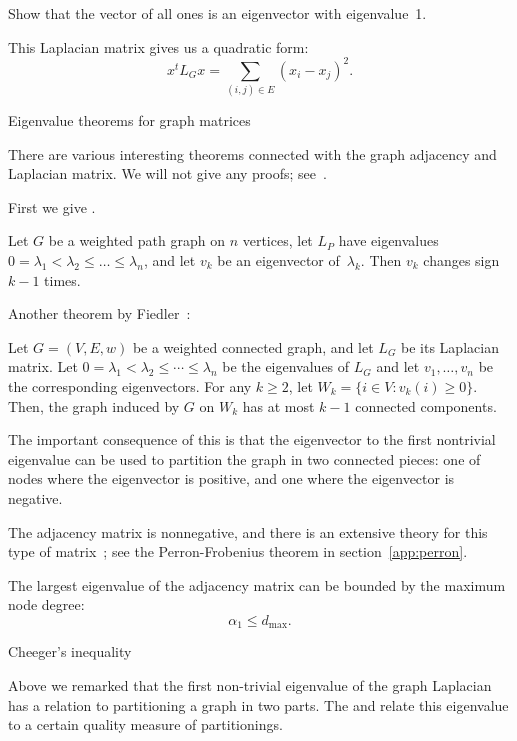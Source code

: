 \begin{exercise}
  Show that the vector of all ones is an eigenvector with eigenvalue~1.
\end{exercise}

This Laplacian matrix gives us a quadratic form:
\[ x^tL_Gx = \sum_{(i,j)\in E} (x_i-x_j)^2. \]

 {Eigenvalue theorems for graph matrices}
\label{sec:fiedler-vector}

There are various interesting theorems connected with the graph
adjacency and Laplacian matrix. We will not give any proofs;
see~\cite{Spielman:spectral-graph-theory}.

First we give .
\begin{theorem}
  Let $G$ be a weighted path graph on $n$ vertices, let $L_P$ have
  eigenvalues $0 = \lambda_1 < \lambda_2\leq\ldots\leq\lambda_n$, and let
  $v_k$ be an eigenvector of~$\lambda_k$. Then $v_k$ changes sign
  $k-1$ times.
\end{theorem}

Another theorem by Fiedler~\cite{Fiedler:75-property}:
\begin{theorem}
  Let $G = (V,E,w)$ be a weighted connected graph, and let $L_G$ be
  its Laplacian matrix. Let $0 = \lambda_1 < \lambda_2 \leq \cdots
  \leq \lambda_n$ be the eigenvalues of $L_G$ and let $v_1,\ldots,v_n$
  be the corresponding eigenvectors. For any $k \geq 2$, let $W_k
  =\{i\in V\colon v_k(i)\geq0\}$. Then, the graph induced by $G$ on $W_k$
  has at most $k-1$ connected components.
\end{theorem}

The important consequence of this is that the eigenvector to the first
nontrivial eigenvalue can be used to partition the graph in two connected
pieces: one of nodes where the eigenvector is positive, and one where
the eigenvector is negative.

The adjacency matrix is nonnegative, and there is an extensive theory
for this type of matrix~\cite{BePl:book}; see the Perron-Frobenius
theorem in section~\ref{app:perron}.

\begin{lemma}
  The largest eigenvalue of the adjacency matrix can be bounded by the
  maximum node degree:
  \[ \alpha_1\leq d_{\max}. \]
\end{lemma}

 {Cheeger's inequality}

Above we remarked that the first non-trivial eigenvalue of the graph
Laplacian has a relation to partitioning a graph in two parts. The
 and
 relate this eigenvalue to a
certain quality measure of partitionings.

